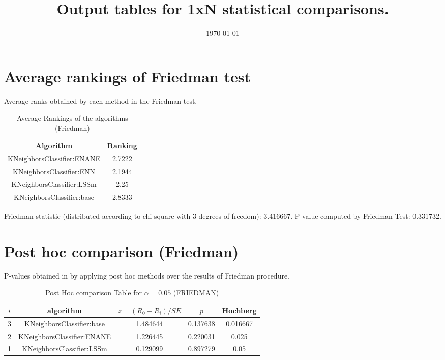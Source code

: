\documentclass[a4paper,10pt]{article}
\title{Output tables for 1xN statistical comparisons.}
\author{}
\date{\today}
\begin{document}
\begin{landscape}
\pagestyle{empty}
\maketitle
\thispagestyle{empty}

\section{Average rankings of Friedman test}


Average ranks obtained by each method in the Friedman test.

\begin{table}[!htp]
\centering
\begin{tabular}{|c|c|}\hline
Algorithm&Ranking\\\hline
KNeighborsClassifier:ENANE&2.7222\\KNeighborsClassifier:ENN&2.1944\\KNeighborsClassifier:LSSm&2.25\\KNeighborsClassifier:base&2.8333\\\hline\end{tabular}
\caption{Average Rankings of the algorithms (Friedman)}
\end{table}

Friedman statistic (distributed according to chi-square with 3 degrees of freedom): 3.416667. \newline P-value computed by Friedman Test: 0.331732.\newline


\newpage

\section{Post hoc comparison (Friedman)}


P-values obtained in by applying post hoc methods over the results of Friedman procedure.

\begin{table}[!htp]
\centering\footnotesize
\begin{tabular}{ccccc}
$i$&algorithm&$z=(R_0 - R_i)/SE$&$p$&Hochberg \\
\hline3&KNeighborsClassifier:base&1.484644&0.137638&0.016667\\2&KNeighborsClassifier:ENANE&1.226445&0.220031&0.025\\1&KNeighborsClassifier:LSSm&0.129099&0.897279&0.05\\\hline
\end{tabular}
\caption{Post Hoc comparison Table for $\alpha=0.05$ (FRIEDMAN)}
\end{table}
\newpage


\end{landscape}
\end{document}
